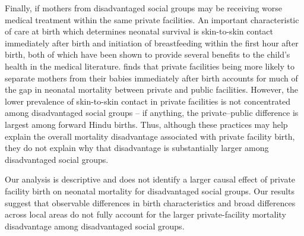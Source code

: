 \documentclass[12pt]{article}
\begin{document}
Finally, if mothers from disadvantaged social groups may be receiving worse medical treatment within the same private facilities. An important characteristic of care at birth which determines neonatal survival is skin-to-skin contact immediately after birth and initiation of breastfeeding within the first hour after birth, both of which have been shown to provide several benefits to the child's health in the medical literature.  \cite{franz2025cheaper} finds that private facilities being more likely to separate mothers from their babies immediately after birth accounts for much of the gap in neonatal mortality between private and public facilities. However, the lower prevalence of skin-to-skin contact in private facilities is not concentrated among disadvantaged social groups -- if anything, the private–public difference is largest among forward Hindu births. Thus, although these practices may help explain the overall mortality disadvantage associated with private facility birth, they do not explain why that disadvantage is substantially larger among disadvantaged social groups.

Our analysis is descriptive and does not identify a larger causal effect of private facility birth on neonatal mortality for disadvantaged social groups. Our results suggest that observable differences in birth characteristics and broad differences across local areas do not fully account for the larger private-facility mortality disadvantage among disadvantaged social groups.





\end{document}
